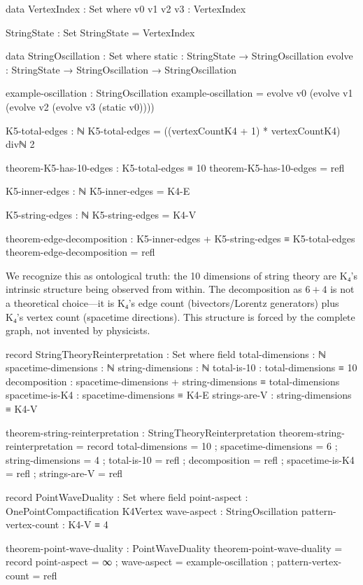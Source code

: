 \documentclass[11pt,a4paper]{book}
\begin{document}
\begin{code}
data VertexIndex : Set where
  v0 v1 v2 v3 : VertexIndex

StringState : Set
StringState = VertexIndex

data StringOscillation : Set where
  static : StringState → StringOscillation
  evolve : StringState → StringOscillation → StringOscillation

example-oscillation : StringOscillation
example-oscillation = evolve v0 (evolve v1 (evolve v2 (evolve v3 (static v0))))

K5-total-edges : ℕ
K5-total-edges = ((vertexCountK4 + 1) * vertexCountK4) divℕ 2

theorem-K5-has-10-edges : K5-total-edges ≡ 10
theorem-K5-has-10-edges = refl

K5-inner-edges : ℕ
K5-inner-edges = K4-E

K5-string-edges : ℕ
K5-string-edges = K4-V

theorem-edge-decomposition : K5-inner-edges + K5-string-edges ≡ K5-total-edges
theorem-edge-decomposition = refl
\end{code}

We recognize this as ontological truth: the 10 dimensions of string theory are K₄'s intrinsic structure being observed from within. The decomposition as $6 + 4$ is not a theoretical choice—it is K₄'s edge count (bivectors/Lorentz generators) plus K₄'s vertex count (spacetime directions). This structure is forced by the complete graph, not invented by physicists.

\begin{code}
record StringTheoryReinterpretation : Set where
  field
    total-dimensions : ℕ
    spacetime-dimensions : ℕ
    string-dimensions : ℕ
    total-is-10 : total-dimensions ≡ 10
    decomposition : spacetime-dimensions + string-dimensions ≡ total-dimensions
    spacetime-is-K4 : spacetime-dimensions ≡ K4-E
    strings-are-V : string-dimensions ≡ K4-V

theorem-string-reinterpretation : StringTheoryReinterpretation
theorem-string-reinterpretation = record
  { total-dimensions = 10
  ; spacetime-dimensions = 6
  ; string-dimensions = 4
  ; total-is-10 = refl
  ; decomposition = refl
  ; spacetime-is-K4 = refl
  ; strings-are-V = refl
  }

\end{code}

\begin{code}
record PointWaveDuality : Set where
  field
    point-aspect : OnePointCompactification K4Vertex
    wave-aspect : StringOscillation
    pattern-vertex-count : K4-V ≡ 4

theorem-point-wave-duality : PointWaveDuality
theorem-point-wave-duality = record
  { point-aspect = ∞
  ; wave-aspect = example-oscillation
  ; pattern-vertex-count = refl
  }
\end{code}
\end{document}
